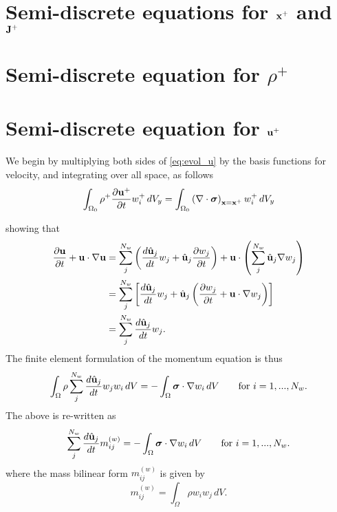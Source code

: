 \documentclass[11pt]{article}
\begin{document}
\section{Semi-discrete equations for $\mathbf{x}^+$ and $\mathbf{J}^+$}

\section{Semi-discrete equation for $\rho^+$}

\section{Semi-discrete equation for $\mathbf{u}^+$}
We begin by multiplying both sides of \cref{eq:evol_u} by the basis functions for velocity, and integrating over all space, as follows
\begin{equation}
    \int_{\Omega_0} \rho^+ \frac{\partial \mathbf{u}^+}{\partial t} w^+_i \, dV_y = \int_{\Omega_0} \left ( \nabla \cdot \bm \sigma \right )_{\mathbf{x} = \mathbf{x}^+} w^+_i \, dV_y
\end{equation}


showing that
\begin{align}
    \frac{\partial \mathbf{u}}{\partial t} + \mathbf{u} \cdot \nabla \mathbf{u} &= \sum_j^{N_w} \left ( \frac{d \hat{\mathbf{u}}_j}{d t} w_j + \hat{\mathbf{u}}_j \frac{\partial w_j}{\partial t} \right ) + \mathbf{u} \cdot \left ( \sum_j^{N_w} \hat{\mathbf{u}}_j \nabla w_j \right ) \nonumber \\
    &= \sum_j^{N_w} \left [ \frac{d \hat{\mathbf{u}}_j}{d t} w_j + \hat{\mathbf{u}}_j \left ( \frac{\partial w_j}{\partial t} + \mathbf{u} \cdot \nabla w_j \right ) \right ] \nonumber \\
    &= \sum_j^{N_w} \frac{d \hat{\mathbf{u}}_j}{d t} w_j.
\end{align}
The finite element formulation of the momentum equation is thus 
\begin{equation}
    \int_\Omega \rho \sum_j^{N_w} \frac{d \hat{\mathbf{u}}_j}{d t} w_j w_i \, dV = -\int_\Omega \bm \sigma \cdot \nabla w_i \, dV \qquad \text{for } i = 1,...,N_w.
\end{equation}
The above is re-written as
\begin{equation}
    \label{eq:semi_discrete_momentum_bilinear}
    \sum_j^{N_w} \frac{d \hat{\mathbf{u}}_j}{d t} m^{(w)}_{ij} = -\int_\Omega \bm \sigma \cdot \nabla w_i \, dV \qquad \text{for } i = 1,...,N_w.
\end{equation}
where the mass bilinear form $m^{(w)}_{ij}$ is given by 
\begin{equation}
    m^{(w)}_{ij} = \int_\Omega \rho w_i w_j \, dV.
\end{equation}
\end{document}
